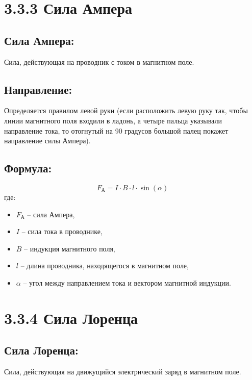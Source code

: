 \documentclass[a4paper,12pt]{article}
\begin{document}
\newpage
\section*{3.3.3 Сила Ампера}
\vspace{-9pt}
\subsection*{Сила Ампера:}
\vspace{-3pt}
Сила, действующая на проводник с током в магнитном поле.

\vspace{-9pt}
\subsection*{Направление:}
\vspace{-3pt}
Определяется правилом левой руки (если расположить левую руку так, чтобы линии магнитного поля входили в ладонь, а четыре пальца указывали направление тока, то отогнутый на 90 градусов большой палец покажет направление силы Ампера).

\vspace{-9pt}
\subsection*{Формула:}
\vspace{-3pt}

\vspace{-0.05em}
$$ F_А = I \cdot B \cdot l \cdot \sin(\alpha) $$
где:
\begin{itemize}
    \item $F_А$ – сила Ампера,
    \item $I$ – сила тока в проводнике,
    \item $B$ – индукция магнитного поля,
    \item $l$ – длина проводника, находящегося в магнитном поле,
    \item $\alpha$ – угол между направлением тока и вектором магнитной индукции.
\end{itemize}


\section*{3.3.4 Сила Лоренца}
\vspace{-9pt}
\subsection*{Сила Лоренца:}
\vspace{-3pt}
Сила, действующая на движущийся электрический заряд в магнитном поле.
\end{document}
